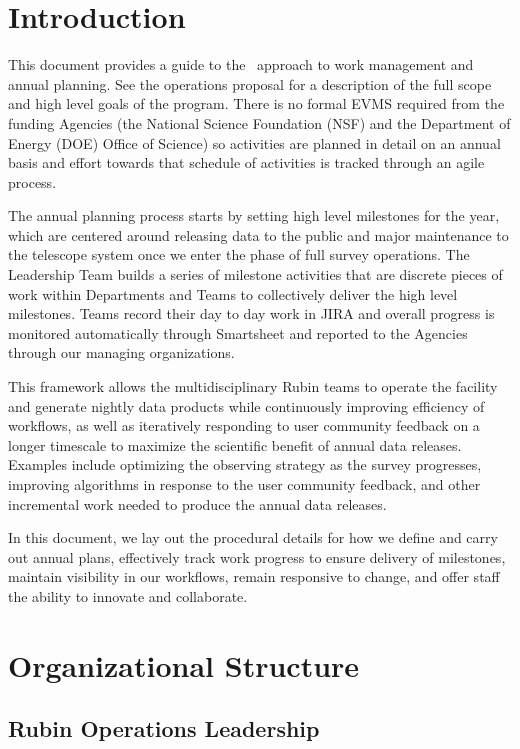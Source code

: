 \section{Introduction}

This document provides a guide to the \VRO\ approach to work management and annual planning.
See the operations proposal  for a description of the full scope and high level goals of the program.
There is no formal \gls{EVMS} required from the funding Agencies (the National Science Foundation (NSF) and the Department of Energy (DOE) Office of Science) so activities are planned in detail on an annual basis and effort towards that schedule of activities is tracked through an agile process.

The annual planning process starts by setting high level milestones for the year, which are centered around releasing data to the public and major maintenance to the telescope system once we enter the phase of full survey operations.   
The Leadership Team builds a series of milestone activities that are discrete pieces of work within Departments and Teams to collectively deliver the high level milestones.  
Teams record their day to day work in \gls{JIRA} and overall progress is monitored automatically through Smartsheet and reported to the Agencies through our managing organizations.

This framework allows the multidisciplinary Rubin teams to operate the facility and generate nightly data products while continuously improving efficiency of workflows,
as well as iteratively responding to user community feedback on a longer timescale to maximize the scientific benefit of annual data releases.
Examples include optimizing the observing strategy as the survey progresses, improving algorithms in response to the user community feedback, 
and other incremental work needed to produce the annual data releases.

In this document, we lay out the procedural details for how we define and carry out annual plans, effectively track work progress to ensure delivery of milestones, maintain visibility in our workflows, remain responsive to change, and offer staff the ability to innovate and collaborate.

\section{Organizational Structure}
\label{sec:structure}

\subsection{Rubin Operations Leadership}
\label{sec:contacts}


